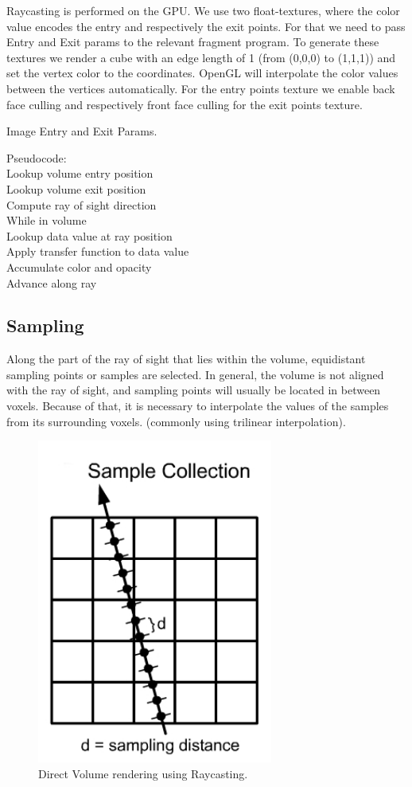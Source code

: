 Raycasting is performed on the GPU. We use two float-textures, where the color value encodes the entry and respectively the exit points. For that we need to pass Entry and Exit params to the relevant fragment program.  To generate these textures we render a cube with an edge length of 1 (from (0,0,0) to (1,1,1)) and set the vertex color to the coordinates. OpenGL will interpolate the color values between the vertices automatically. For the entry points texture we enable back face culling and respectively front face culling for the exit points texture.


Image Entry and Exit Params.

Pseudocode: \\

    Lookup volume entry position  \\
    Lookup volume exit position  \\
    Compute ray of sight direction  \\
    While in volume  \\
        Lookup data value at ray position  \\
        Apply transfer function to data value \\ 
        Accumulate color and opacity  \\
        Advance along ray  \\
	

\subsection{Sampling} 

Along the part of the ray of sight that lies within the volume, equidistant sampling points or samples are selected. In general, the volume is not aligned with the ray of sight, and sampling points will usually be located in between voxels. Because of that, it is necessary to interpolate the values of the samples from its surrounding voxels. (commonly using trilinear interpolation).

\begin{figure}
\centering
\includegraphics[width=220pt]{Images/sampling1.jpg}
\caption{\label{fig:ray_cast1.jpg} Direct Volume rendering using Raycasting.}
\end{figure}

